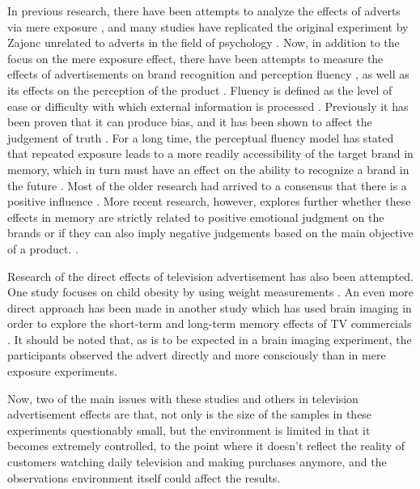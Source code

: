 \documentclass[review]{elsarticle}
\providecommand{\DIFaddtex}[1]{{\protect\color{blue}\uwave{#1}}} %
\providecommand{\DIFaddbegin}{} %
\providecommand{\DIFaddend}{} %
\providecommand{\DIFadd}[1]{\texorpdfstring{\DIFaddtex{#1}}{#1}} %
\newcommand{\DIFaddincludegraphics}[2][]{{\color{blue}\fbox{\DIFOincludegraphics[#1]{#2}}}} %
\DeclareRobustCommand{\DIFaddbegin}{\DIFOaddbegin \let\includegraphics\DIFaddincludegraphics} %
\DeclareRobustCommand{\DIFaddend}{\DIFOaddend \let\includegraphics\DIFOincludegraphics} %
\begin{document}
In previous research, there have been attempts to analyze the effects of adverts via mere exposure \cite{hekkert}, and many studies have replicated the original experiment by Zajonc unrelated to adverts in the field of psychology \cite{huang,dechene}. Now, in addition to the focus on the mere exposure effect, there have been attempts to measure the effects of advertisements on brand recognition and perception fluency \cite{fang}, as well as its effects on the perception of the product \cite{gmuer}. Fluency is defined as the level of ease or difficulty with which external information is processed \cite{schwarz}. Previously it has been proven that it can produce bias, and it has been shown to affect the judgement of truth \cite{silva}. For a long time, the perceptual fluency model has stated that repeated exposure leads to a more readily accessibility of the target brand in memory, which in turn must have an effect on the ability to recognize a brand in the future \cite[e.g.][]{jacoby}. Most of the older research had arrived to a consensus that there is a positive influence \cite{reber, seamon}. More recent research, however, explores further whether these effects in memory are strictly related to positive emotional judgment on the brands or if they can also imply negative judgements based on the main objective of a product. \cite{lee-a}. 

Research of the direct effects of television advertisement has also been attempted. One study focuses on child obesity by using weight measurements \cite{boyland}. An even more direct approach has been made in another study which has used brain imaging in order to explore the short-term and long-term memory effects of TV commercials \cite{rossiter}. It should be noted that, as is to be expected in a brain imaging experiment, the participants observed the advert directly and more consciously than in mere exposure experiments. 

Now, two of the main issues with these studies and others in television advertisement effects are that, not only is the size of the samples in these experiments questionably small, but the environment is limited in that it becomes extremely controlled, to the point where it doesn't reflect the reality of customers watching daily television \DIFaddbegin \DIFadd{in their homes }\DIFaddend and making purchases anymore, and the observations environment itself could affect the results. 
\end{document}
